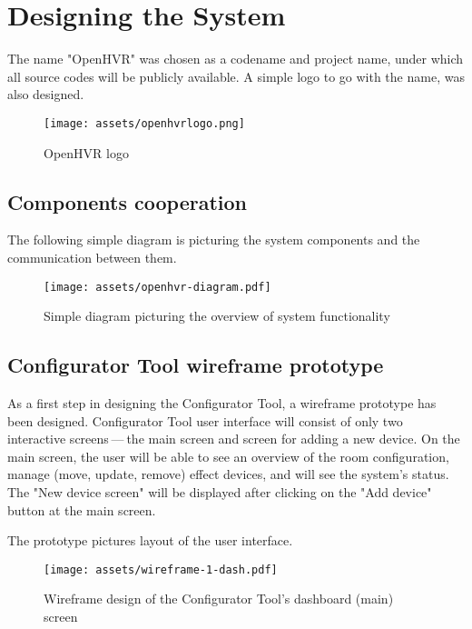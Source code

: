 \chapter{Designing the System}

The name "OpenHVR" was chosen as a codename and project name, under which
all source codes will be publicly available. A simple logo to
go with the name, was also designed.

\begin{figure}[h]{}
\centering\texttt{[image: assets/openhvrlogo.png]}
\caption{OpenHVR logo}
\end{figure}

\hypertarget{x-components-cooperation}{\section{Components cooperation}}
The following simple diagram is picturing the system components and the
communication between them.


\begin{figure}[h]{}
\centering\texttt{[image: assets/openhvr-diagram.pdf]}
\caption{Simple diagram picturing the overview of system functionality}

\end{figure}


\hypertarget{x-configurator-tool-wireframe-prototype}{\section{Configurator Tool wireframe prototype}}
As a first step in designing the Configurator Tool, a wireframe prototype
has been designed. Configurator Tool user interface will consist of only
two interactive screens — the main screen and screen for adding a new device.
On the main screen, the user will be able to see an overview of the room configuration,
manage (move, update, remove) effect devices, and will see the system’s status.
The "New device screen" will be displayed after clicking on the "Add device"
button at the main screen.


The prototype pictures layout of the user interface.


\begin{figure}[h]{}
\centering\texttt{[image: assets/wireframe-1-dash.pdf]}
\caption{Wireframe design of the Configurator Tool's dashboard (main) screen}
\end{figure}

